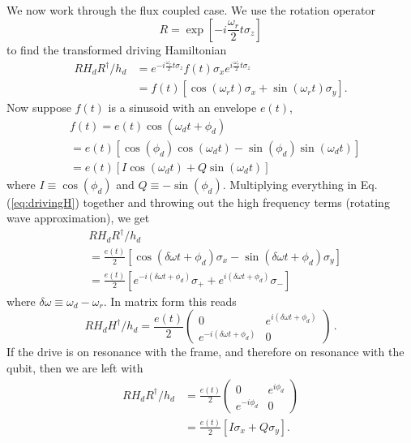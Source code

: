 We now work through the flux coupled case.
We use the rotation operator \begin{equation}
R = \exp \left[ -i \frac{\omega_r}{2} t \sigma_z \right] \end{equation}
to find the transformed driving Hamiltonian \begin{align}
RH_d R^{\dagger}/h_d
&= e^{-i \frac{\omega_r}{2} t \sigma_z} f(t)\sigma_x e^{i \frac{\omega_r}{2} t \sigma_z} \nonumber \\
&= f(t)\left[ \cos\left(\omega_r t\right)\sigma_x + \sin\left(\omega_r t\right)\sigma_y \right]. \label{eq:drivingH}
\end{align}
Now suppose $f(t)$ is a sinusoid with an envelope $e(t)$,
\begin{align}
& f(t)
= e(t)\cos \left( \omega_d t + \phi_d \right) \\
&= e(t) \left[ \cos \left( \phi_d \right) \cos \left( \omega_d t \right) - \sin \left( \phi_d \right) \sin \left( \omega_d t \right) \right] \\
&= e(t) \left[ I \cos\left(\omega_d t\right) + Q \sin \left(\omega_d t\right) \right] \label{eq:drivingFunctionIQ}
\end{align}
where $I \equiv \cos(\phi_d)$ and $Q \equiv - \sin(\phi_d)$.
Multiplying everything in Eq. (\ref{eq:drivingH}) together and throwing out the high frequency terms (rotating wave approximation), we get
\begin{align}
& RH_dR^{\dagger}/h_d \\
&= \frac{e(t)}{2} \left[ \cos(\delta\omega t + \phi_d)\sigma_x - \sin(\delta\omega t + \phi_d)\sigma_y \right] \\
&= \frac{e(t)}{2} \left[ e^{-i(\delta \omega t + \phi_d)} \sigma_+ + e^{i(\delta \omega t + \phi_d)} \sigma_- \right]
\end{align}
where $\delta\omega \equiv \omega_d - \omega_r$. In matrix form this reads
\begin{equation}
RH_dH^{\dagger}/h_d = \frac{e(t)}{2} \left( \begin{array}{cc} 0 & e^{i(\delta\omega t + \phi_d)} \\ e^{-i(\delta\omega t + \phi_d)} & 0 \end{array}\right) \, . \label{eq:drivingH_matrixForm}
\end{equation}
If the drive is on resonance with the frame, and therefore on resonance with the qubit, then we are left with
\begin{align}
RH_dR^{\dagger}/h_d
&= \frac{e(t)}{2}\left( \begin{array}{cc} 0 & e^{i\phi_d} \\ e^{-i\phi_d} & 0 \end{array}\right) \\
&= \frac{e(t)}{2} \left[ I \sigma_x + Q \sigma_y \right] .
\end{align}
